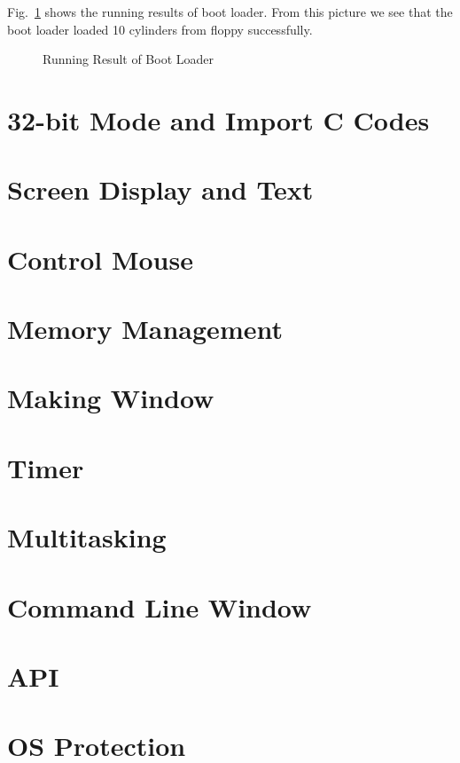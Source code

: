 \documentclass{swfcthesis}
\begin{document}
Fig.~\ref{fig:iplRes} shows the running results of boot loader. From this picture we
see that the boot loader loaded 10 cylinders from floppy successfully. 

\begin{figure}[!ht]
  \centering
  \caption{Running Result of Boot Loader}
  \label{fig:iplRes}
\end{figure}



\section{32-bit Mode and Import C Codes}


\section{Screen Display and Text}

\section{Control Mouse}


\section{Memory Management}

\section{Making Window }

\section{Timer}

\section{Multitasking}

\section{Command Line Window}

\section{API}

\section{OS Protection}
\end{document}

